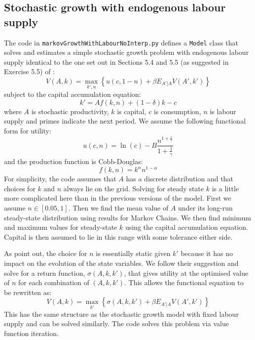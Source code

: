 \subsection{Stochastic growth with endogenous labour supply}

The code in \texttt{markovGrowthWithLabourNoInterp.py} defines a \texttt{Model} class that solves and estimates a simple stochastic growth problem with endogenous labour supply identical to the one set out in Sections 5.4 and 5.5 (as suggested in Exercise 5.5) of \citet{adda2003dynamic}:
\begin{equation}
	V(A, k) = \max_{k', n} \left\{ u(c, 1-n) + \beta E_{A' | A} V(A', k') \right\}
\end{equation}
subject to the capital accumulation equation:
\begin{equation}
	k' = Af(k, n) + (1 - \delta)k - c
\end{equation}
where \(A\) is stochastic productivity, \(k\) is capital, \(c\) is consumption, \(n\) is labour supply and primes indicate the next period. We assume the following functional form for utility:
\begin{equation}
	u(c, n) = \ln(c) - B \frac{n^{1 + \frac{1}{\gamma}}}{1 + \frac{1}{\gamma}}
\end{equation}
and the production function is Cobb-Douglas:
\begin{equation}
	f(k, n) = k^{\alpha} n^{1 - \alpha}
\end{equation}
%
For simplicity, the code assumes that \(A\) has a discrete distribution and that choices for \(k\) and \(n\) always lie on the grid. Solving for steady state \(k\) is a little more complicated here than in the previous versions of the model. First we assume \(n \in [0.05, 1]\). Then we find the mean value of \(A\) under its long-run steady-state distribution using results for Markov Chains. We then find minimum and maximum values for steady-state \(k\) using the capital accumulation equation. Capital is then assumed to lie in this range with some tolerance either side.

As \citet{adda2003dynamic} point out, the choice for \(n\) is essentially static given \(k'\) because it has no impact on the evolution of the state variables. We follow their suggestion and solve for a return function, \(\sigma(A, k, k')\), that gives utility at the optimised value of \(n\) for each combination of \((A, k, k')\). This allows the functional equation to be rewritten as:
\begin{equation}
	V(A, k) = \max_{k'} \left\{ \sigma(A, k, k') + \beta E_{A' | A} V(A', k') \right\}
\end{equation}
This has the same structure as the stochastic growth model with fixed labour supply and can be solved similarly. The code solves this problem via value function iteration.

